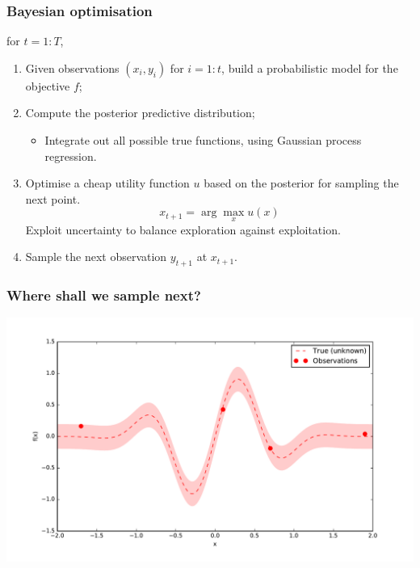 \documentclass{beamer}
\begin{document}
\begin{frame}
    \frametitle{Bayesian optimisation}

    for $t=1:T$,
    \begin{enumerate}
        \item Given observations $(x_i, y_i)$ for $i=1:t$, build a probabilistic model for the objective $f$;

            \vspace{1em}

        \item Compute the posterior predictive distribution;
            \begin{itemize}
                \item Integrate out all possible true functions, using
                Gaussian process regression.
            \end{itemize}

            \vspace{1em}

        \item Optimise a cheap utility  function $u$ based on the posterior for sampling the next point.
            $$x_{t+1} = \arg \max_x u(x)$$
            Exploit uncertainty to balance exploration against exploitation.

        \item Sample the next observation $y_{t+1}$ at $x_{t+1}$.
    \end{enumerate}

\end{frame}

\begin{frame}
    \frametitle{Where shall we sample next?}

    \begin{center}
        \includegraphics[width=\textwidth]{code/fig1.pdf}
    \end{center}
\end{frame}
\end{document}

